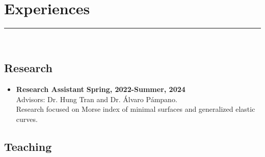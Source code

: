 \documentclass[12pt]{book}
\begin{document}
\section*{Experiences}
\rule{\textwidth}{1pt}\\
\subsection*{Research}

\begin{itemize}
	\item \textbf{Research Assistant} \hfill \textbf{Spring, 2022-Summer, 2024}\\
 Advisors:  Dr. Hung Tran and Dr. \'Alvaro P\'ampano.  \\
Research focused on Morse index of minimal surfaces and generalized elastic curves. 

\end{itemize}



\subsection*{Teaching}
\end{document}
